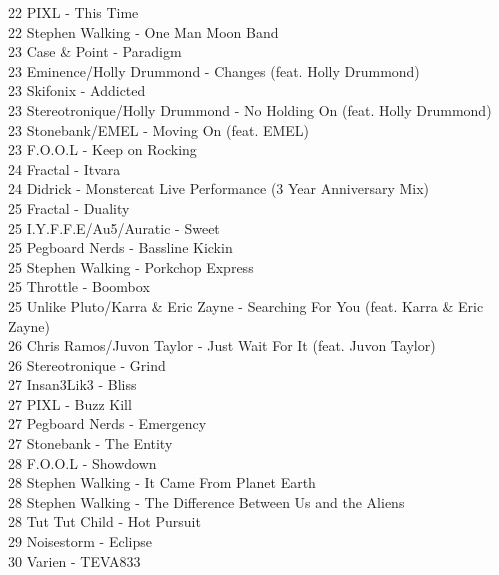 \begin{multicols}{2}
22 PIXL - This Time\\ 22 Stephen Walking - One Man Moon Band\\ 23 Case \& Point - Paradigm\\ 23 Eminence/Holly Drummond - Changes (feat. Holly Drummond)\\ 23 Skifonix - Addicted\\ 23 Stereotronique/Holly Drummond - No Holding On (feat. Holly Drummond)\\ 23 Stonebank/EMEL - Moving On (feat. EMEL)\\ 23 F.O.O.L - Keep on Rocking\\ 24 Fractal - Itvara\\ 24 Didrick - Monstercat Live Performance (3 Year Anniversary Mix)\\ 25 Fractal - Duality\\ 25 I.Y.F.F.E/Au5/Auratic - Sweet\\ 25 Pegboard Nerds - Bassline Kickin\\ 25 Stephen Walking - Porkchop Express\\ 25 Throttle - Boombox\\ 25 Unlike Pluto/Karra \& Eric Zayne - Searching For You (feat. Karra \& Eric Zayne)\\ 26 Chris Ramos/Juvon Taylor - Just Wait For It (feat. Juvon Taylor)\\ 26 Stereotronique - Grind\\ 27 Insan3Lik3 - Bliss\\ 27 PIXL - Buzz Kill\\ 27 Pegboard Nerds - Emergency\\ 27 Stonebank - The Entity\\ 28 F.O.O.L - Showdown\\ 28 Stephen Walking - It Came From Planet Earth\\ 28 Stephen Walking - The Difference Between Us and the Aliens\\ 28 Tut Tut Child - Hot Pursuit\\ 29 Noisestorm - Eclipse\\ 30 Varien - TEVA833\\
\\

\end{multicols}
